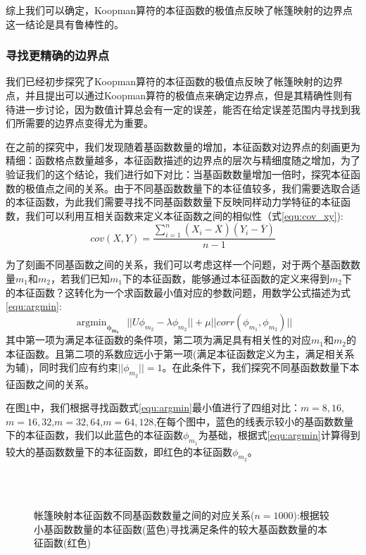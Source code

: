 综上我们可以确定，Koopman算符的本征函数的极值点反映了帐篷映射的边界点这一结论是具有鲁棒性的。


\subsubsection{寻找更精确的边界点}
我们已经初步探究了Koopman算符的本征函数的极值点反映了帐篷映射的边界点，并且提出可以通过Koopman算符的极值点来确定边界点，但是其精确性则有待进一步讨论，因为数值计算总会有一定的误差，能否在给定误差范围内寻找到我们所需要的边界点变得尤为重要。

在之前的探究中，我们发现随着基函数数量的增加，本征函数对边界点的刻画更为精细：函数格点数量越多，本征函数描述的边界点的层次与精细度随之增加，为了验证我们的这个结论，我们进行如下对比：当基函数数量增加一倍时，探究本征函数的极值点之间的关系。由于不同基函数数量下的本征值较多，我们需要选取合适的本征函数，为此我们需要寻找不同基函数数量下反映同样动力学特征的本征函数，我们可以利用互相关函数来定义本征函数之间的相似性（式\ref{equ:cov_xy}):
\begin{equation}
  cov(X,Y)=\dfrac{\sum_{i=1}^{n}(X_i-\overline{X})(Y_i-\overline{Y})}{n-1}
  \label{equ:cov_xy}
\end{equation}

为了刻画不同基函数之间的关系，我们可以考虑这样一个问题，对于两个基函数数量$m_1$和$m_2$，若我们已知$m_1$下的本征函数，能够通过本征函数的定义来得到$m_2$下的本征函数？这转化为一个求函数最小值对应的参数问题，用数学公式描述为式\ref{equ:argmin}:
\begin{equation}
  \mathop{\arg\min}_{\boldsymbol{\phi_{m_2}}} \ \ || U\phi_{m_2}-\lambda \phi_{m_2} || + \mu ||corr(\phi_{m_1},\phi_{m_2})||
  \label{equ:argmin}
\end{equation}
其中第一项为满足本征函数的条件项，第二项为满足具有相关性的对应$m_1$和$m_2$的本征函数。且第二项的系数应远小于第一项(满足本征函数定义为主，满足相关系为辅)，同时我们应有约束$||\phi_{m_2}||=1$。在此条件下，我们探究不同基函数数量下本征函数之间的关系。

在图\ref{fig:Tent_findeigen_m8m16}中，我们根据寻找函数式\ref{equ:argmin}最小值进行了四组对比：$m=8,16$,$m=16,32$,$m=32,64$,$m=64,128$,在每个图中，蓝色的线表示较小的基函数数量下的本征函数，我们以此蓝色的本征函数$\phi_{m_1}$为基础，根据式\ref{equ:argmin}计算得到较大的基函数数量下的本征函数，即红色的本征函数$\phi_{m_2}$。

\begin{figure}[!]
  \centering
    \\
    \\
  \caption[帐篷映射本征函数不同基函数数量之间的对应关系]{帐篷映射本征函数不同基函数数量之间的对应关系($n=1000$):根据较小基函数数量的本征函数(蓝色)寻找满足条件的较大基函数数量的本征函数(红色)}\label{fig:Tent_findeigen_m8m16}
\end{figure}

